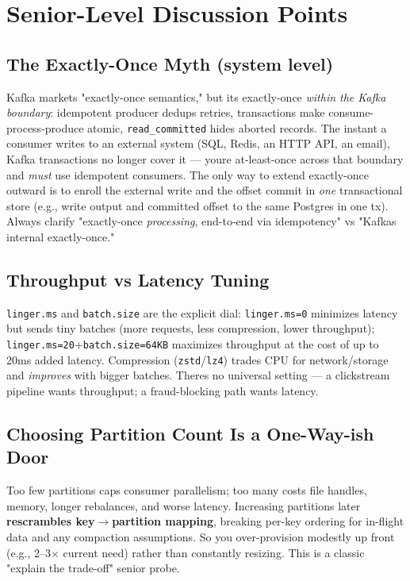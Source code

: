 \documentclass[11pt]{article}
\begin{document}
\section{Senior-Level Discussion Points}\label{senior-level-discussion-points}

\subsection{The Exactly-Once Myth (system level)}\label{the-exactly-once-myth-system-level}

Kafka markets "exactly-once semantics," but it\textquotesingle s exactly-once \emph{within the Kafka boundary}: idempotent producer dedups retries, transactions make consume-process-produce atomic, \texttt{read\_committed} hides aborted records. The instant a consumer writes to an external system (SQL, Redis, an HTTP API, an email), Kafka transactions no longer cover it --- you\textquotesingle re at-least-once across that boundary and \emph{must} use idempotent consumers. The only way to extend exactly-once outward is to enroll the external write and the offset commit in \emph{one} transactional store (e.g., write output and committed offset to the same Postgres in one tx). Always clarify "exactly-once \emph{processing}, end-to-end via idempotency" vs "Kafka\textquotesingle s internal exactly-once."

\subsection{Throughput vs Latency Tuning}\label{throughput-vs-latency-tuning}

\texttt{linger.ms} and \texttt{batch.size} are the explicit dial: \texttt{linger.ms=0} minimizes latency but sends tiny batches (more requests, less compression, lower throughput); \texttt{linger.ms=20}+\texttt{batch.size=64KB} maximizes throughput at the cost of up to 20ms added latency. Compression (\texttt{zstd}/\texttt{lz4}) trades CPU for network/storage and \emph{improves} with bigger batches. There\textquotesingle s no universal setting --- a clickstream pipeline wants throughput; a fraud-blocking path wants latency.

\subsection{Choosing Partition Count Is a One-Way-ish Door}\label{choosing-partition-count-is-a-one-way-ish-door}

Too few partitions caps consumer parallelism; too many costs file handles, memory, longer rebalances, and worse latency. Increasing partitions later \textbf{rescrambles key\(\rightarrow\)partition mapping}, breaking per-key ordering for in-flight data and any compaction assumptions. So you over-provision modestly up front (e.g., 2--3\(\times\) current need) rather than constantly resizing. This is a classic "explain the trade-off" senior probe.
\end{document}
